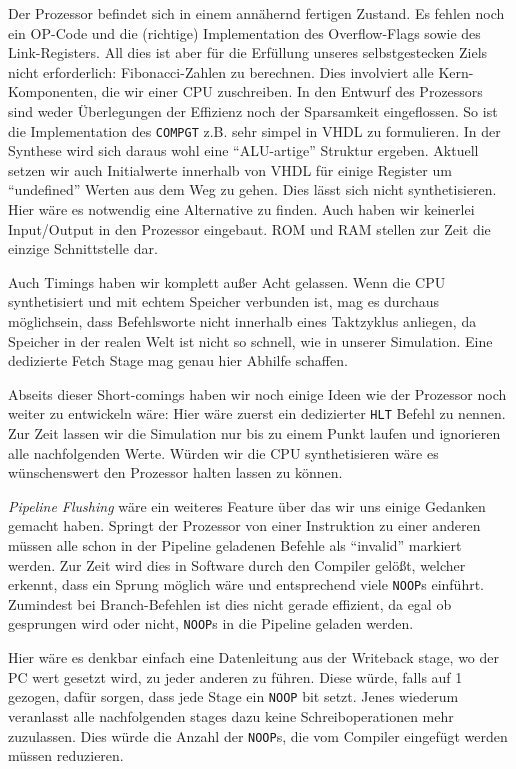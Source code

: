 \documentclass[paper=a4,fontsize=12pt,twocolumn]{scrreprt}
\begin{document}
Der Prozessor befindet sich in einem annähernd fertigen Zustand.
Es fehlen noch ein OP-Code und die (richtige) Implementation des Overflow-Flags sowie des Link-Registers.
All dies ist aber für die Erfüllung unseres selbstgestecken Ziels nicht erforderlich: Fibonacci-Zahlen zu berechnen.
Dies involviert alle Kern-Komponenten, die wir einer CPU zuschreiben.
In den Entwurf des Prozessors sind weder Überlegungen der Effizienz noch der Sparsamkeit eingeflossen.
So ist die Implementation des \texttt{COMPGT} z.B. sehr simpel in VHDL zu formulieren.
In der Synthese wird sich daraus wohl eine \enquote{ALU-artige} Struktur ergeben.
Aktuell setzen wir auch Initialwerte innerhalb von VHDL für einige Register um \enquote{undefined} Werten aus dem Weg zu gehen.
Dies lässt sich nicht synthetisieren.
Hier wäre es notwendig eine Alternative zu finden.
Auch haben wir keinerlei Input/Output in den Prozessor eingebaut.
ROM und RAM stellen zur Zeit die einzige Schnittstelle dar.

Auch Timings haben wir komplett außer Acht gelassen.
Wenn die CPU synthetisiert und mit echtem Speicher verbunden ist, mag es durchaus möglich\footnotemark sein, dass Befehlsworte nicht innerhalb eines Taktzyklus anliegen, da Speicher in der realen Welt ist nicht so schnell, wie in unserer Simulation.
Eine dedizierte Fetch Stage mag genau hier Abhilfe schaffen.

Abseits dieser Short-comings haben wir noch einige Ideen wie der Prozessor noch weiter zu entwickeln wäre:
Hier wäre zuerst ein dedizierter \texttt{HLT} Befehl zu nennen.
Zur Zeit lassen wir die Simulation nur bis zu einem Punkt laufen und ignorieren alle nachfolgenden Werte.
Würden wir die CPU synthetisieren wäre es wünschenswert den Prozessor halten lassen zu können.

\textit{Pipeline Flushing} wäre ein weiteres Feature über das wir uns einige Gedanken gemacht haben.
Springt der Prozessor von einer Instruktion zu einer anderen müssen alle schon in der Pipeline geladenen Befehle als \enquote{invalid} markiert werden.
Zur Zeit wird dies in Software durch den Compiler gelößt, welcher erkennt, dass ein Sprung möglich wäre und entsprechend viele \texttt{NOOP}s einführt.
Zumindest bei Branch-Befehlen ist dies nicht gerade effizient, da egal ob gesprungen wird oder nicht, \texttt{NOOP}s in die Pipeline geladen werden.

Hier wäre es denkbar einfach eine Datenleitung aus der Writeback stage, wo der PC wert gesetzt wird, zu jeder anderen zu führen.
Diese würde, falls auf 1 gezogen, dafür sorgen, dass jede Stage ein \texttt{NOOP} bit setzt.
Jenes wiederum veranlasst alle nachfolgenden stages dazu keine Schreiboperationen mehr zuzulassen.
Dies würde die Anzahl der \texttt{NOOP}s, die vom Compiler eingefügt werden müssen reduzieren.
\end{document}

